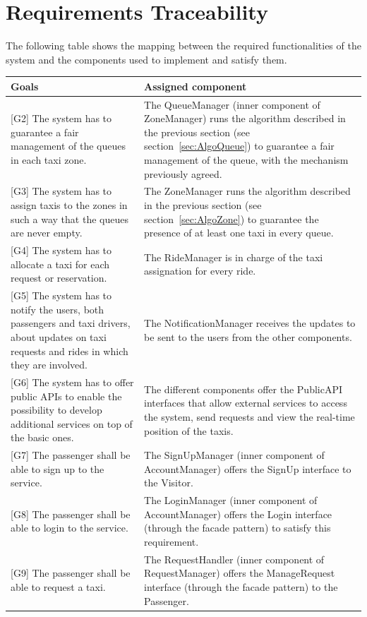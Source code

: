 \documentclass[a4paper,11pt]{report} %
\begin{document}
	\section{Requirements Traceability}
	The following table shows the mapping between the required functionalities of the system and the components used to implement and satisfy them.
	\begin{center}
		\begin{longtable}{| p{7cm} | p{8cm} |}\hline
			\centerline{\textbf{Goals}} & \centerline{\textbf{Assigned component}} \\\hline
			{[}G2{]} The system has to guarantee a fair management of the queues in each taxi zone. & The QueueManager (inner component of ZoneManager) runs the algorithm described in the previous section (see section~\ref{sec:AlgoQueue}) to guarantee a fair management of the queue, with the mechanism previously agreed.\\\hline
			{[}G3{]} The system has to assign taxis to the zones in such a way that the queues are never empty. & The ZoneManager runs the algorithm described in the previous section (see section~\ref{sec:AlgoZone}) to guarantee the presence of at least one taxi in every queue.\\\hline
			{[}G4{]} The system has to allocate a taxi for each request or reservation. & The RideManager is in charge of the taxi assignation for every ride.\\\hline
			{[}G5{]} The system has to notify the users, both passengers and taxi drivers, about updates on taxi requests and rides in which they are involved. & The NotificationManager receives the updates to be sent to the users from the other components.\\\hline
			{[}G6{]} The system has to offer public APIs to enable the possibility to develop additional services on top of the basic ones. & The different components offer the PublicAPI interfaces that allow external services to access the system, send requests and view the real-time position of the taxis.\\\hline
			{[}G7{]} The passenger shall be able to sign up to the service. & The SignUpManager (inner component of AccountManager) offers the SignUp interface to the Visitor.\\\hline
			{[}G8{]} The passenger shall be able to login to the service. & The LoginManager (inner component of AccountManager) offers the Login interface (through the facade pattern) to satisfy this requirement.\\\hline	
			{[}G9{]} The passenger shall be able to request a taxi. & The RequestHandler (inner component of RequestManager) offers the ManageRequest interface (through the facade pattern) to the Passenger.\\\hline

\end{longtable}
\end{center}
\end{document}
